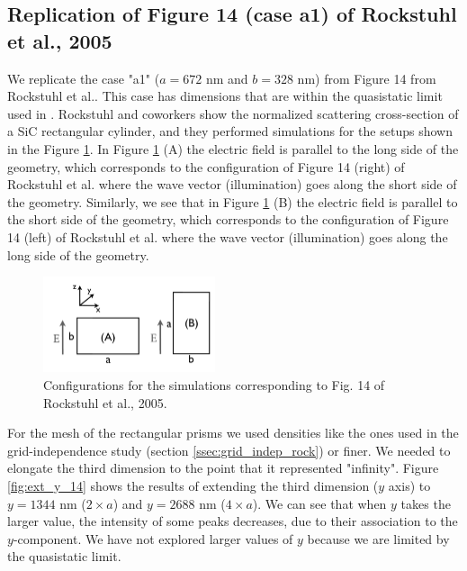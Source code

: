 \subsection{Replication of Figure 14 (case a1) of Rockstuhl et al., 2005}

We replicate the case "a1" ($a=672$ nm and $b=328$ nm) from Figure 14 from Rockstuhl et al.. This 
case has dimensions that are within the quasistatic limit used in \pygbe. Rockstuhl and coworkers show the normalized
scattering cross-section of a SiC rectangular cylinder, and they performed simulations for the setups shown in the Figure
\ref{fig:rectangle_sketch}. In Figure \ref{fig:rectangle_sketch} (A) the electric field is parallel to the long side of the geometry, which 
corresponds to the configuration of Figure 14 (right) of Rockstuhl et al. where the wave vector (illumination) goes along the short side of the geometry. 
Similarly, we see that in Figure \ref{fig:rectangle_sketch} (B) the electric field is parallel to the short side of the geometry, which 
corresponds to the configuration of Figure 14 (left) of Rockstuhl et al. where the wave vector (illumination) goes along the long side of the geometry.

\begin{figure}[h]
   \centering
   \includegraphics[width=0.45\textwidth]{rockstuhl_rectangles.pdf} 
   \caption{Configurations for the simulations corresponding to Fig. 14 of Rockstuhl et al., 2005.}
   \label{fig:rectangle_sketch}
\end{figure}

For the mesh of the rectangular prisms we used densities like the ones used in the grid-independence study (section \ref{ssec:grid_indep_rock}) or finer. We 
needed to elongate the third dimension to the point that it represented "infinity". Figure \ref{fig:ext_y_14} shows the results of extending the third 
dimension ($y$ axis) to $y=1344$ nm ($2\times a$) and $y=2688$ nm ($4\times a$). We can see that when $y$ takes the larger value, the intensity of 
some peaks decreases, due to their association to the $y$-component. We have not explored larger values of $y$ because we are limited by the quasistatic limit.

